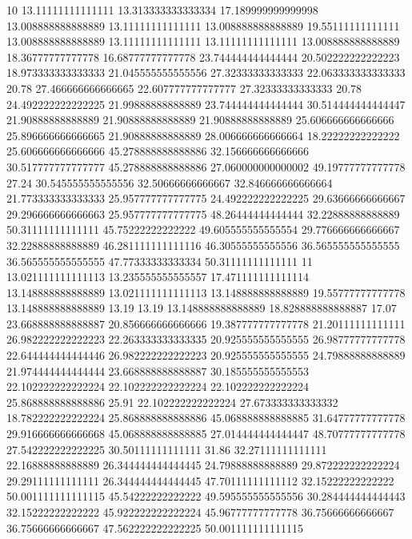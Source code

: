 10 13.11111111111111 13.313333333333334 17.189999999999998 13.008888888888889 13.11111111111111 13.008888888888889 19.55111111111111 13.008888888888889 13.11111111111111 13.11111111111111 13.008888888888889 18.36777777777778 16.68777777777778 23.744444444444444 20.502222222222223 18.973333333333333 21.045555555555556 27.32333333333333 22.063333333333333 20.78 27.466666666666665 22.607777777777777 27.32333333333333 20.78 24.492222222222225 21.99888888888889 23.744444444444444 30.514444444444447 21.90888888888889 21.90888888888889 21.90888888888889 25.606666666666666 25.896666666666665 21.90888888888889 28.006666666666664 18.22222222222222 25.606666666666666 45.278888888888886 32.156666666666666 30.517777777777777 45.278888888888886 27.060000000000002 49.19777777777778 27.24 30.545555555555556 32.50666666666667 32.846666666666664 21.773333333333333 25.957777777777775 24.492222222222225 29.63666666666667 29.296666666666663 25.957777777777775 48.26444444444444 32.22888888888889 50.31111111111111 45.75222222222222 49.605555555555554 29.776666666666667 32.22888888888889 46.281111111111116 46.30555555555556 36.565555555555555 36.565555555555555 47.77333333333334 50.31111111111111
11 13.021111111111113 13.235555555555557 17.471111111111114 13.148888888888889 13.021111111111113 13.148888888888889 19.55777777777778 13.148888888888889 13.19 13.19 13.148888888888889 18.828888888888887 17.07 23.668888888888887 20.856666666666666 19.387777777777778 21.20111111111111 26.982222222222223 22.263333333333335 20.925555555555555 26.98777777777778 22.644444444444446 26.982222222222223 20.925555555555555 24.79888888888889 21.974444444444444 23.668888888888887 30.185555555555553 22.102222222222224 22.102222222222224 22.102222222222224 25.868888888888886 25.91 22.102222222222224 27.673333333333332 18.782222222222224 25.868888888888886 45.068888888888885 31.64777777777778 29.916666666666668 45.068888888888885 27.014444444444447 48.70777777777778 27.542222222222225 30.50111111111111 31.86 32.27111111111111 22.16888888888889 26.344444444444445 24.79888888888889 29.872222222222224 29.29111111111111 26.344444444444445 47.70111111111112 32.15222222222222 50.001111111111115 45.54222222222222 49.595555555555556 30.284444444444443 32.15222222222222 45.922222222222224 45.96777777777778 36.75666666666667 36.75666666666667 47.562222222222225 50.001111111111115
